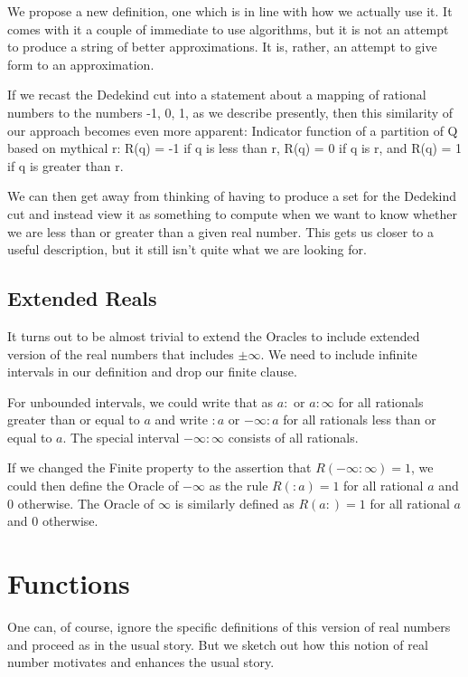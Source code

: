 \documentclass[12pt]{article}
\theoremstyle{remark}
\begin{document}
We propose a new definition, one which is in line with how we actually use it.
It comes with it a couple of immediate to use algorithms, but it is not an
attempt to produce a string of better approximations. It is, rather, an
attempt to give form to an approximation.

If we recast the Dedekind cut into a statement about a mapping of rational
numbers to the numbers -1, 0, 1, as we describe presently, then this
similarity of our approach becomes even more apparent: 
Indicator function of a partition of Q based on mythical r: 
R(q) = -1 if q is less than r, R(q) = 0 if q is r, and R(q) = 1 if q is
greater than r. 

We can then get away from thinking of having to produce a set for the Dedekind
cut and instead view it as something to compute when we want to know whether
we are less than or greater than a given real number. This gets us closer to a
useful description, but it still isn't quite what we are looking for. 

\subsection{Extended Reals}

It turns out to be almost trivial to extend the Oracles to include extended version of the real numbers that includes $\pm \infty$. We need to include infinite intervals in our definition and drop our finite clause.

For unbounded intervals, we could write that as $a:$ or $a:\infty$ for all rationals greater than or equal to $a$ and write $:a$ or $-\infty:a$ for all rationals less than or equal to $a$. The special interval $-\infty:\infty$ consists of all rationals. 

If we changed the Finite property to the assertion that $R(-\infty:\infty)=1$, we could then define the Oracle of $-\infty$ as the rule $R(:a) = 1$ for all rational $a$ and 0 otherwise. The Oracle of $\infty$ is similarly defined as $R(a:)=1$  for all rational $a$ and 0 otherwise. 


\section{Functions}

One can, of course, ignore the specific definitions of this version of real numbers and proceed as in the usual story. But we sketch out how this notion of real number motivates and enhances the usual story. 
\end{document}
